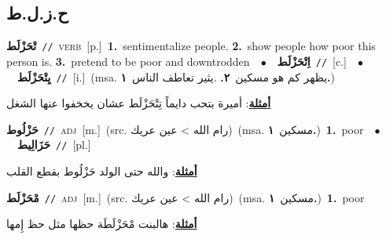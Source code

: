 \documentclass[10pt,a4paper,twoside]{article} %
\begin{document}
\begin{multicols}{2}
\vspace{-3mm}
\subsection*{\color{blue}\foreignlanguage{arabic}{ح.ز.ل.ط}\color{blue}{}} 

{\setlength\topsep{0pt}\textbf{\foreignlanguage{arabic}{تْحَزْلَط}}\ {\color{gray}\texttt{//}\color{black}}\ \textsc{verb}\ [p.]\ \textbf{1.}~sentimentalize people.  \textbf{2.}~show people how poor this person is.  \textbf{3.}~pretend to be poor and downtrodden\ \ $\bullet$\ \ \setlength\topsep{0pt}\textbf{\foreignlanguage{arabic}{اِتْحَزْلَط}}\ {\color{gray}\texttt{//}\color{black}}\ [c.]\ \ $\bullet$\ \ \setlength\topsep{0pt}\textbf{\foreignlanguage{arabic}{يِتْحَزْلَط}}\ {\color{gray}\texttt{//}\color{black}}\ [i.]\ \color{gray}(msa. \foreignlanguage{arabic}{يظهر كم هو مسكين}~\foreignlanguage{arabic}{\textbf{٢.}}  .\foreignlanguage{arabic}{يثير تعاطف الناس}~\foreignlanguage{arabic}{\textbf{١.}})\color{black}\  \begin{flushright}\color{gray}\foreignlanguage{arabic}{\textbf{\underline{\foreignlanguage{arabic}{أمثلة}}}: أميرة بتحب دايماً تِتْحَزْلَط عشان يخخفوا عنها الشغل}\end{flushright}\color{black}} \vspace{2mm}

{\setlength\topsep{0pt}\textbf{\foreignlanguage{arabic}{حَزْلُوط}}\ {\color{gray}\texttt{//}\color{black}}\ \textsc{adj}\ [m.]\ (src. \color{gray}\foreignlanguage{arabic}{رام الله > عين عريك}\color{black})\ \color{gray}(msa. \foreignlanguage{arabic}{مسكين}~\foreignlanguage{arabic}{\textbf{١.}})\color{black}\ \textbf{1.}~poor\ \ $\bullet$\ \ \setlength\topsep{0pt}\textbf{\foreignlanguage{arabic}{حَزَالِيط}}\ {\color{gray}\texttt{//}\color{black}}\ [pl.]\  \begin{flushright}\color{gray}\foreignlanguage{arabic}{\textbf{\underline{\foreignlanguage{arabic}{أمثلة}}}: والله حتى الولد حَزْلُوط بقطع القلب}\end{flushright}\color{black}} \vspace{2mm}

{\setlength\topsep{0pt}\textbf{\foreignlanguage{arabic}{مْحَزْلَط}}\ {\color{gray}\texttt{//}\color{black}}\ \textsc{adj}\ [m.]\ (src. \color{gray}\foreignlanguage{arabic}{رام الله > عين عريك}\color{black})\ \color{gray}(msa. \foreignlanguage{arabic}{مسكين}~\foreignlanguage{arabic}{\textbf{١.}})\color{black}\ \textbf{1.}~poor\  \begin{flushright}\color{gray}\foreignlanguage{arabic}{\textbf{\underline{\foreignlanguage{arabic}{أمثلة}}}: هالبنت مْحَزْلَطَة حظها مثل حظ إِمها}\end{flushright}\color{black}} \vspace{2mm}


\end{multicols}
\end{document}
